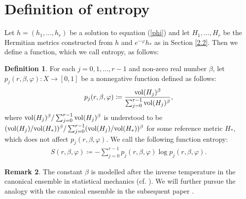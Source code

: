 \documentclass[12pt]{article}
\theoremstyle{definition}
\newtheorem{defi}{Definition}%
\newtheorem{rem}[defi]{Remark}
\def\refe{\ast}
\def\vol{{\rm vol}}
\begin{document}
\section{Definition of entropy}\label{4}
Let $h=(h_1,\dots, h_r)$ be a solution to equation (\ref{phi}) and let $H_1,\dots, H_r$ be the Hermitian metrics constructed from $h$ and $e^{-\varphi}h_\refe$ as in Section \ref{2.2}. Then we define a function, which we call entropy, as follows:
\begin{defi}\label{entropy2} 
For each $j=0, 1,\dots, r-1$ and non-zero real number $\beta$, let $p_j(r,\beta, \varphi):X\rightarrow [0,1]$ be a nonnegative function defined as follows:
\begin{align*}
p_j(r,\beta, \varphi)\coloneqq \frac{\vol(H_j)^\beta}{\sum_{j=0}^{r-1}\vol(H_j)^\beta},
\end{align*}
where $\vol(H_j)^\beta/\sum_{j=0}^{r-1}\vol(H_j)^\beta$ is understood to be $(\vol(H_j)/\vol(H_\refe))^\beta/\sum_{j=0}^{r-1}(\vol(H_j)/\vol(H_\refe))^\beta$ for some reference metric $H_\refe$, which does not affect $p_j(r,\beta,\varphi)$. We call the following function entropy:
\begin{align*}
S(r,\beta, \varphi)\coloneqq -\sum_{j=0}^{r-1} p_j(r,\beta, \varphi)\log p_j(r,\beta, \varphi).
\end{align*}
\end{defi}
\begin{rem} The constant $\beta$ is modelled after the inverse temperature in the canonical ensemble in statistical mechanics (cf. \cite{LL1}). We will further pursue the analogy with the canonical ensemble in the subsequent paper \cite{Miy4}.
\end{rem}
\end{document}
